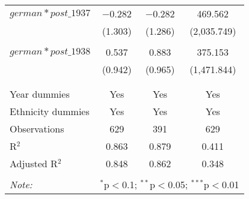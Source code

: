 \begin{table}[!htbp]
\begin{tabular}{@{\extracolsep{5pt}}lccc}
 $german*post\_1937$ & $-$0.282 & $-$0.282 & 469.562 \\ 
  & (1.303) & (1.286) & (2,035.749) \\ 
  & & & \\ 
 $german*post\_1938$ & 0.537 & 0.883 & 375.153 \\ 
  & (0.942) & (0.965) & (1,471.844) \\ 
  & & & \\ 
\hline \\[-1.8ex] 
Year dummies & Yes & Yes & Yes \\ 
Ethnicity dummies & Yes & Yes & Yes \\ 
Observations & 629 & 391 & 629 \\ 
R$^{2}$ & 0.863 & 0.879 & 0.411 \\ 
Adjusted R$^{2}$ & 0.848 & 0.862 & 0.348 \\ 
\hline 
\hline \\[-1.8ex] 
\textit{Note:}  & \multicolumn{3}{r}{$^{*}$p$<$0.1; $^{**}$p$<$0.05; $^{***}$p$<$0.01} \\ 
\end{tabular} 
\end{table} 
